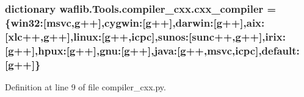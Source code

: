 \subsubsection[{\texorpdfstring{cxx\+\_\+compiler}{cxx_compiler}}]{\setlength{\rightskip}{0pt plus 5cm}dictionary waflib.\+Tools.\+compiler\+\_\+cxx.\+cxx\+\_\+compiler = \{\textquotesingle{}win32\textquotesingle{}\+:\mbox{[}\textquotesingle{}msvc\textquotesingle{},\textquotesingle{}g++\textquotesingle{}\mbox{]},\textquotesingle{}cygwin\textquotesingle{}\+:\mbox{[}\textquotesingle{}g++\textquotesingle{}\mbox{]},\textquotesingle{}darwin\textquotesingle{}\+:\mbox{[}\textquotesingle{}g++\textquotesingle{}\mbox{]},\textquotesingle{}aix\textquotesingle{}\+:\mbox{[}\textquotesingle{}xlc++\textquotesingle{},\textquotesingle{}g++\textquotesingle{}\mbox{]},\textquotesingle{}linux\textquotesingle{}\+:\mbox{[}\textquotesingle{}g++\textquotesingle{},\textquotesingle{}icpc\textquotesingle{}\mbox{]},\textquotesingle{}sunos\textquotesingle{}\+:\mbox{[}\textquotesingle{}sunc++\textquotesingle{},\textquotesingle{}g++\textquotesingle{}\mbox{]},\textquotesingle{}irix\textquotesingle{}\+:\mbox{[}\textquotesingle{}g++\textquotesingle{}\mbox{]},\textquotesingle{}hpux\textquotesingle{}\+:\mbox{[}\textquotesingle{}g++\textquotesingle{}\mbox{]},\textquotesingle{}gnu\textquotesingle{}\+:\mbox{[}\textquotesingle{}g++\textquotesingle{}\mbox{]},\textquotesingle{}java\textquotesingle{}\+:\mbox{[}\textquotesingle{}g++\textquotesingle{},\textquotesingle{}msvc\textquotesingle{},\textquotesingle{}icpc\textquotesingle{}\mbox{]},\textquotesingle{}default\textquotesingle{}\+:\mbox{[}\textquotesingle{}g++\textquotesingle{}\mbox{]}\}}\hypertarget{namespacewaflib_1_1_tools_1_1compiler__cxx_adbc821cfa666db26930d68d7556f1432}{}\label{namespacewaflib_1_1_tools_1_1compiler__cxx_adbc821cfa666db26930d68d7556f1432}


Definition at line 9 of file compiler\+\_\+cxx.\+py.


